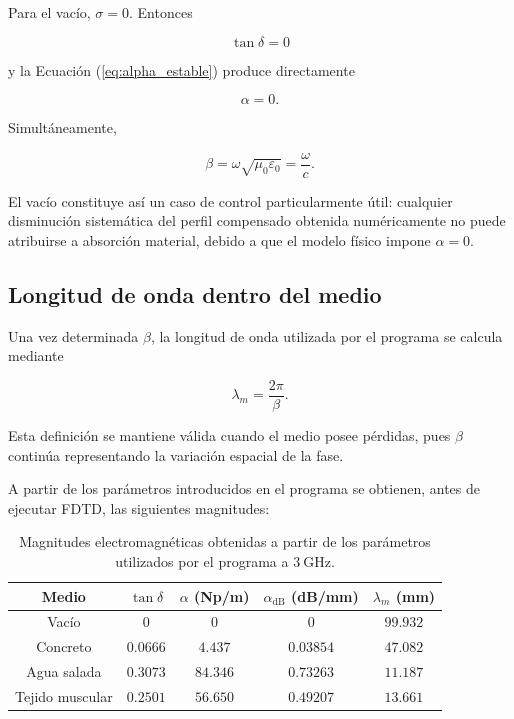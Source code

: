 Para el vacío, $\sigma=0$. Entonces

\begin{equation}
\tan\delta=0
\end{equation}

y la Ecuación (\ref{eq:alpha_estable}) produce directamente

\begin{equation}
\alpha=0.
\end{equation}

Simultáneamente,

\begin{equation}
\beta
=
\omega\sqrt{\mu_0\varepsilon_0}
=
\frac{\omega}{c}.
\end{equation}

El vacío constituye así un caso de control particularmente útil: cualquier disminución sistemática del perfil compensado obtenida numéricamente no puede atribuirse a absorción material, debido a que el modelo físico impone $\alpha=0$.

\subsection{Longitud de onda dentro del medio}

Una vez determinada $\beta$, la longitud de onda utilizada por el programa se calcula mediante

\begin{equation}
\lambda_m
=
\frac{2\pi}{\beta}.
\label{eq:lambda_medio}
\end{equation}

Esta definición se mantiene válida cuando el medio posee pérdidas, pues $\beta$ continúa representando la variación espacial de la fase.

A partir de los parámetros introducidos en el programa se obtienen, antes de ejecutar FDTD, las siguientes magnitudes:

\begin{table}[H]
\centering
\begin{tabular}{|c|c|c|c|c|}
\hline
Medio &
$\tan\delta$ &
$\alpha$ (Np/m) &
$\alpha_{\mathrm{dB}}$ (dB/mm) &
$\lambda_m$ (mm)
\\ \hline
Vacío
& $0$
& $0$
& $0$
& $99.932$
\\ \hline
Concreto
& $0.0666$
& $4.437$
& $0.03854$
& $47.082$
\\ \hline
Agua salada
& $0.3073$
& $84.346$
& $0.73263$
& $11.187$
\\ \hline
Tejido muscular
& $0.2501$
& $56.650$
& $0.49207$
& $13.661$
\\ \hline
\end{tabular}
\caption{Magnitudes electromagnéticas obtenidas a partir de los parámetros utilizados por el programa a $3~\mathrm{GHz}$.}
\label{tab:parametros_derivados}
\end{table}


